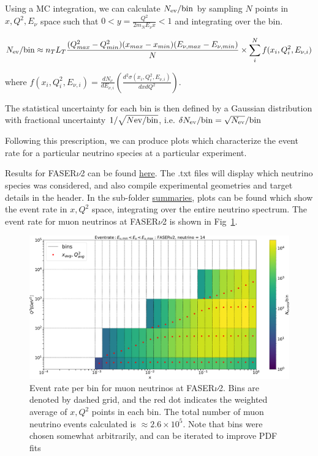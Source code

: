 Using a MC integration, we can calculate $N_{\rm ev}/{\rm bin}$ by sampling $N$ points in $x,Q^2,E_{\nu}$ space such that $0< y = \frac{Q^2}{2m_N E_{\nu }x} < 1$ and integrating over the bin.

\begin{equation}
    N_{\rm ev}/{\rm bin} \approx n_T L_T \frac{(Q^2_{max}-Q^2_{min})(x_{max}-x_{min})(E_{\nu ,max}-E_{\nu ,min})}{N}\times \sum_i^N f(x_i,Q^2_i,E_{\nu ,i})
    \label{MCintegration}
\end{equation}

where $f(x_i,Q^2_i,E_{\nu ,i}) = \frac{dN_{\nu}}{dE_{\nu,i}}\left(\frac{d^2\sigma(x_i,Q^2_i,E_{\nu,i})}{dxdQ^2}\right)$. 

The statistical uncertainty for each bin is then defined by a Gaussian distribution with fractional uncertainty $1/\sqrt{N{\rm ev}/{\rm bin}}$, i.e. $\delta N_{\rm ev}/{\rm bin} = \sqrt{N_{\rm ev}} /{\rm bin}$


  Following this prescription, we can produce plots which characterize the event rate for a particular neutrino species at a particular experiment. 

Results for FASER$\nu$2 can be found \href{https://github.com/juanrojochacon/FPF-WG1/tree/main/results}{here}. The .txt files will display which neutrino species was considered, and also compile experimental geometries and target details in the header. In the sub-folder \href{https://github.com/juanrojochacon/FPF-WG1/tree/main/results/Summaries}{summaries}, plots can be found which show the event rate in $x,Q^2$ space, integrating over the entire neutrino spectrum. The event rate for muon neutrinos at FASER$\nu$2 is shown in Fig~\ref{fig:fasernu2_muon}.

\begin{figure}[h]
    \centering
\includegraphics[width=1\textwidth]{plots/Nevent_FASERv2_14.pdf}
    \caption{Event rate per bin for muon neutrinos at FASER$\nu$2. Bins are denoted by dashed grid, and the red dot indicates the weighted average of $x,Q^2$ points in each bin. The total number of muon neutrino events calculated is $\approx2.6\times 10^5$. Note that bins were chosen somewhat arbitrarily, and can be iterated to improve PDF fits }
    \label{fig:fasernu2_muon}
\end{figure}


